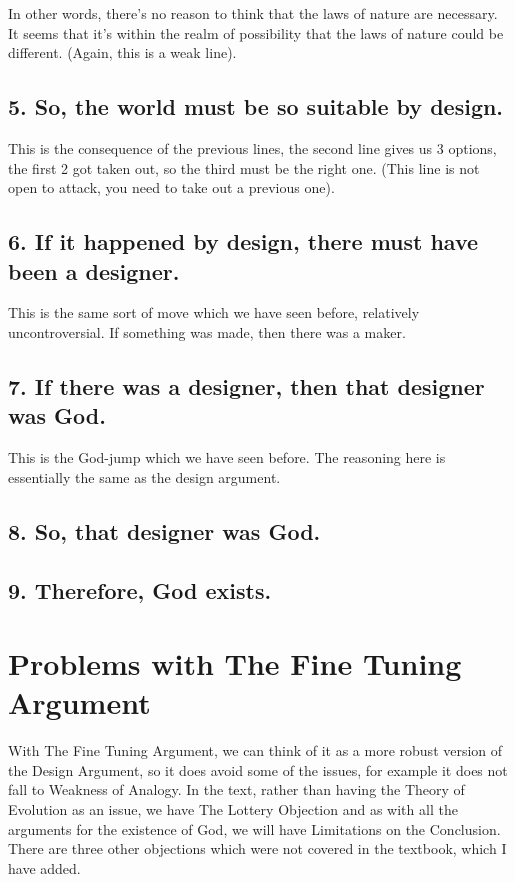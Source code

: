 In other words, there's no reason to think that the laws of nature are necessary. It seems that it's within the realm of possibility that the laws of nature could be different. (Again, this is a weak line).

\subsection{5. So, the world must be so suitable by design.}

This is the consequence of the previous lines, the second line gives us 3 options, the first 2 got taken out, so the third must be the right one. (This line is not open to attack, you need to take out a previous one).

\subsection{6. If it happened by design, there must have been a designer.}

This is the same sort of move which we have seen before, relatively uncontroversial. If something was made, then there was a maker.

\subsection{7. If there was a designer, then that designer was God.}

This is the God-jump which we have seen before. The reasoning here is essentially the same as the design argument. 

\subsection{8. So, that designer was God.}

\subsection{9. Therefore, God exists.}

\section{Problems with The Fine Tuning Argument}
With The Fine Tuning Argument, we can think of it as a more robust version of the Design Argument, so it does avoid some of the issues, for example it does not fall to Weakness of Analogy. In the text, rather than having the Theory of Evolution as an issue, we have The Lottery Objection and as with all the arguments for the existence of God, we will have Limitations on the Conclusion. There are three other objections which were not covered in the textbook, which I have added.
